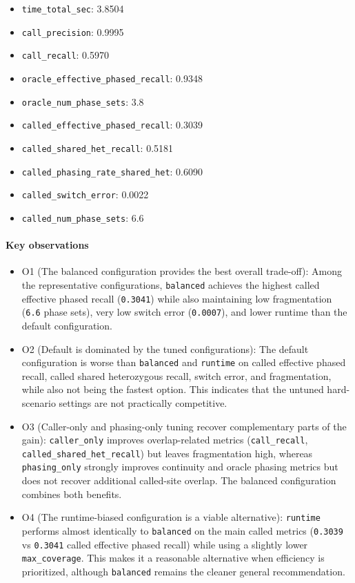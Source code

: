\documentclass[
]{article}
\providecommand{\tightlist}{%
  \setlength{\itemsep}{0pt}\setlength{\parskip}{0pt}}
\begin{document}
\begin{itemize}
  \begin{itemize}
  \tightlist
  \item
    \texttt{time\_total\_sec}: 3.8504
  \item
    \texttt{call\_precision}: 0.9995
  \item
    \texttt{call\_recall}: 0.5970
  \item
    \texttt{oracle\_effective\_phased\_recall}: 0.9348
  \item
    \texttt{oracle\_num\_phase\_sets}: 3.8
  \item
    \texttt{called\_effective\_phased\_recall}: 0.3039
  \item
    \texttt{called\_shared\_het\_recall}: 0.5181
  \item
    \texttt{called\_phasing\_rate\_shared\_het}: 0.6090
  \item
    \texttt{called\_switch\_error}: 0.0022
  \item
    \texttt{called\_num\_phase\_sets}: 6.6
  \end{itemize}
\end{itemize}

\paragraph{Key observations}\label{key-observations-14}

\begin{itemize}
\item
  O1 (The balanced configuration provides the best overall trade-off):
  Among the representative configurations, \texttt{balanced} achieves
  the highest called effective phased recall (\texttt{0.3041}) while
  also maintaining low fragmentation (\texttt{6.6} phase sets), very low
  switch error (\texttt{0.0007}), and lower runtime than the default
  configuration.
\item
  O2 (Default is dominated by the tuned configurations): The default
  configuration is worse than \texttt{balanced} and \texttt{runtime} on
  called effective phased recall, called shared heterozygous recall,
  switch error, and fragmentation, while also not being the fastest
  option. This indicates that the untuned hard-scenario settings are not
  practically competitive.
\item
  O3 (Caller-only and phasing-only tuning recover complementary parts of
  the gain): \texttt{caller\_only} improves overlap-related metrics
  (\texttt{call\_recall}, \texttt{called\_shared\_het\_recall}) but
  leaves fragmentation high, whereas \texttt{phasing\_only} strongly
  improves continuity and oracle phasing metrics but does not recover
  additional called-site overlap. The balanced configuration combines
  both benefits.
\item
  O4 (The runtime-biased configuration is a viable alternative):
  \texttt{runtime} performs almost identically to \texttt{balanced} on
  the main called metrics (\texttt{0.3039} vs \texttt{0.3041} called
  effective phased recall) while using a slightly lower
  \texttt{max\_coverage}. This makes it a reasonable alternative when
  efficiency is prioritized, although \texttt{balanced} remains the
  cleaner general recommendation.
\end{itemize}
\end{document}
